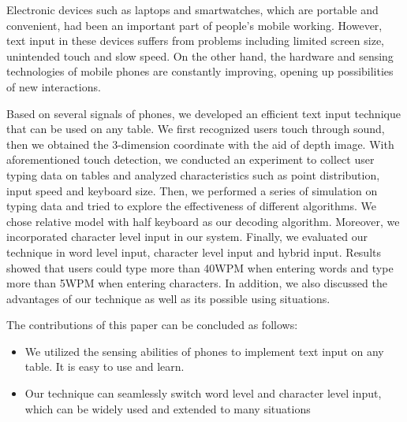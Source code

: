 \begin{abstract*}
    Electronic devices such as laptops and smartwatches, which are portable and convenient, had been an important part of people's mobile working. However, text input in these devices suffers from problems including limited screen size, unintended touch and slow speed. On the other hand, the hardware and sensing technologies of mobile phones are constantly improving, opening up possibilities of new interactions.
    
    Based on several signals of phones, we developed an efficient text input technique that can be used on any table. We first recognized users touch through sound, then we obtained the 3-dimension coordinate with the aid of depth image. With aforementioned touch detection, we conducted an experiment to collect user typing data on tables and analyzed characteristics such as point distribution, input speed and keyboard size. Then, we performed a series of simulation on typing data and tried to explore the effectiveness of different algorithms. We chose relative model with half keyboard as our decoding algorithm. Moreover, we incorporated character level input in our system. Finally, we evaluated our technique in word level input, character level input and hybrid input. Results showed that users could type more than 40WPM when entering words and 
   type more than 5WPM when entering characters. In addition, we also discussed the advantages of our technique as well as its possible using situations.
    
    The contributions of this paper can be concluded as follows:
    \begin{itemize}
        \item We utilized the sensing abilities of phones to implement text input on any table. It is easy to use and learn.
        \item Our technique can seamlessly switch word level and character level input, which can be widely used and extended to many situations
    \end{itemize}
\end{abstract*}
